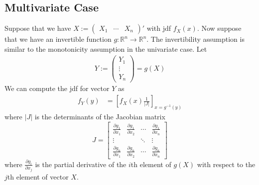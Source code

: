 \documentclass[12pt]{article}
\theoremstyle{plain}
\theoremstyle{definition}
\theoremstyle{remark}
\newcommand{\ra}{\rightarrow}
\newcommand{\Rn}{\mathbb{R}^n}
\begin{document}
\subsection{Multivariate Case}

Suppose that we have
$X:=\begin{pmatrix}X_1 & \cdots & X_n\end{pmatrix}'$ with jdf
$f_{X}(x)$.
Now suppose that we have an invertible function $g:\Rn\ra\Rn$. The
invertibility assumption is similar to the monotonicity assumption in
the univariate case.  Let
\begin{align*}
  Y:= \begin{pmatrix} Y_1 \\ \vdots \\ Y_n \end{pmatrix}
  = g(X)
\end{align*}
We can compute the jdf for vector $Y$ as
\begin{align*}
  f_{Y}(y)
   &= \left[
      f_{X}(x)\frac{1}{\lvert J\rvert}
      \right]_{x=g^{-1}(y)}
\end{align*}
where $|J|$ is the determinants of the Jacobian matrix
\begin{equation}
   J = \begin{bmatrix} \frac{\partial g_1}{\partial x_1} &
      \frac{\partial g_1}{\partial x_2} & \cdots &
      \frac{\partial g_1}{\partial x_n} \\
      \vdots & & \ddots & \vdots \\
      \frac{\partial g_n}{\partial x_1} &
      \frac{\partial g_n}{\partial x_2} & \cdots &
      \frac{\partial g_n}{\partial x_n}
   \end{bmatrix}
\end{equation}
where $\frac{\partial g_i}{\partial x_j}$ is the partial derivative of
the $i$th element of $g(X)$ with respect to the $j$th element of vector
$X$.
\end{document}
